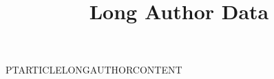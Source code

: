 \documentclass[coreonly,nominted]{pt-article}
\title{Long Author Data}
\begin{document}
\noindent PTARTICLELONGAUTHORCONTENT
\end{document}
